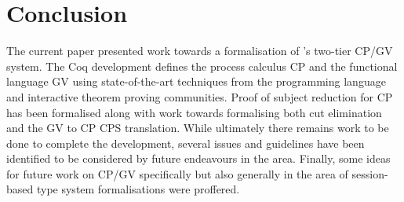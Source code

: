 \section{Conclusion}

The current paper presented work towards a formalisation of
\citeauthor{Wadler:2014}'s two-tier CP/GV system. The Coq development defines
the process calculus CP and the functional language GV using state-of-the-art
techniques from the programming language and interactive theorem proving
communities. Proof of subject reduction for CP has been formalised along with
work towards formalising both cut elimination and the GV to CP CPS
translation. While ultimately there remains work to be done to complete the
development, several issues and guidelines have been identified to be
considered by future endeavours in the area. Finally, some ideas for future
work on CP/GV specifically but also generally in the area of session-based
type system formalisations were proffered.
